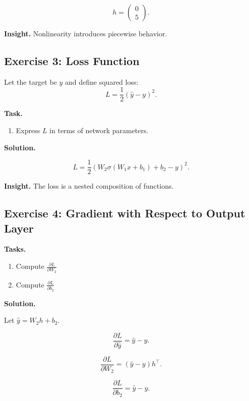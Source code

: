 \[
h = \begin{pmatrix}0 \\ 5\end{pmatrix}.
\]

\medskip

\noindent
\textbf{Insight.}  
Nonlinearity introduces piecewise behavior.

\subsection{Exercise 3: Loss Function}

Let the target be $y$ and define squared loss:
\[
L = \frac{1}{2} (\hat{y} - y)^2.
\]

\medskip

\noindent
\textbf{Task.}
\begin{enumerate}
    \item Express $L$ in terms of network parameters.
\end{enumerate}

\medskip

\noindent
\textbf{Solution.}

\[
L = \frac{1}{2} \left(W_2 \sigma(W_1 x + b_1) + b_2 - y\right)^2.
\]

\medskip

\noindent
\textbf{Insight.}  
The loss is a nested composition of functions.

\subsection{Exercise 4: Gradient with Respect to Output Layer}

\textbf{Tasks.}
\begin{enumerate}
    \item Compute $\frac{\partial L}{\partial W_2}$
    \item Compute $\frac{\partial L}{\partial b_2}$
\end{enumerate}

\medskip

\noindent
\textbf{Solution.}

Let $\hat{y} = W_2 h + b_2$.

\[
\frac{\partial L}{\partial \hat{y}} = \hat{y} - y.
\]

\[
\frac{\partial L}{\partial W_2} = (\hat{y} - y) h^\top.
\]

\[
\frac{\partial L}{\partial b_2} = \hat{y} - y.
\]

\medskip

